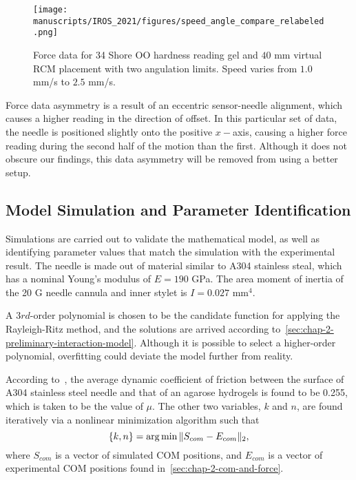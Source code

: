\begin{figure}[tb]
  \centering
  \texttt{[image: manuscripts/IROS\_2021/figures/speed\_angle\_compare\_relabeled.png]}
  \caption{Force data for 34 Shore OO hardness reading gel and $40$ mm virtual RCM placement with two angulation limits. Speed varies from $1.0$ mm/s to $2.5$ mm/s.}
  \label{fig:speed_angle_compare}
\end{figure}

Force data asymmetry is a result of an eccentric sensor-needle alignment, which causes a higher reading in the direction of offset. In this particular set of data, the needle is positioned slightly onto the positive $x-$axis, causing a higher force reading during the second half of the motion than the first. Although it does not obscure our findings, this data asymmetry will be removed from using a better setup.

\subsection{Model Simulation and Parameter Identification}
\label{sec:chap-2-simulation-and-parameter-identification}
Simulations are carried out to validate the mathematical model, as well as identifying parameter values that match the simulation with the experimental result. The needle is made out of material similar to A304 stainless steal, which has a nominal Young's modulus of $E = 190$ GPa. The area moment of inertia of the 20 G needle cannula and inner stylet is $I = 0.027$ mm$^4$.

A $3rd$-order polynomial is chosen to be the candidate function for applying the Rayleigh-Ritz method, and the solutions are arrived according to~\cref{sec:chap-2-preliminary-interaction-model}. Although it is possible to select a higher-order polynomial, overfitting could deviate the model further from reality.

According to~\parencite{urreaEvaluationFrictionCoefficient2016}, the average dynamic coefficient of friction between the surface of A304 stainless steel needle and that of an agarose hydrogels is found to be 0.255, which is taken to be the value of $\mu$. The other two variables, $k$ and $n$, are found iteratively via a nonlinear minimization algorithm such that
\begin{equation}
  \left\{k, n\right\} = \operatorname*{arg\,min} {\|S_{com} - E_{com}\|_2},
\end{equation}
where $S_{com}$ is a vector of simulated COM positions, and $E_{com}$ is a vector of experimental COM positions found in~\cref{sec:chap-2-com-and-force}.

